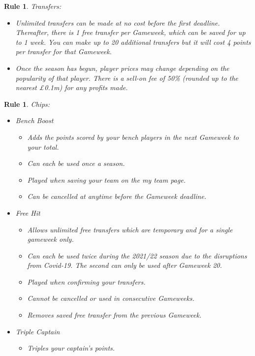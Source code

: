 \documentclass[12pt, a4paper, oneside]{book}
\newtheorem{rules}[theorem]{Rule}
\numberwithin{equation}{section}
\begin{document}
\begin{rules} \label{transfer rules}
  Transfers:
  \begin{itemize}
    \item Unlimited transfers can be made at no cost before the first deadline. Thereafter, there is 1 free transfer per Gameweek, which can be saved for up to 1 week. You can make up to 20 additional transfers but it will cost 4 points per transfer for that Gameweek.
    \item Once the season has begun, player prices may change depending on the popularity of that player. There is a sell-on fee of 50\% (rounded up to the nearest £0.1m) for any profits made.
  \end{itemize}
\end{rules}

\begin{rules} \label{chips rules}
  Chips:
  \begin{itemize}
    \item Bench Boost
    \begin{itemize}
      \item Adds the points scored by your bench players in the next Gameweek to your total.
      \item Can each be used once a season.
      \item Played when saving your team on the my team page.
      \item Can be cancelled at anytime before the Gameweek deadline.
    \end{itemize}
    \item Free Hit
    \begin{itemize}
      \item Allows unlimited free transfers which are temporary and for a single gameweek only.
      \item Can each be used twice during the 2021/22 season due to the disruptions from Covid-19. The second can only be used after Gameweek 20.
      \item Played when confirming your transfers.
      \item Cannot be cancelled or used in consecutive Gameweeks.
      \item Removes saved free transfer from the previous Gameweek.
    \end{itemize}
    \item Triple Captain
    \begin{itemize}
      \item Triples your captain's points.

\end{itemize}
\end{itemize}
\end{rules}
\end{document}

